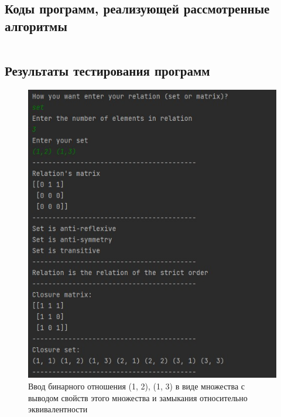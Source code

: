 \documentclass[spec, och, labwork]{shiza}
\begin{document}
        \subsection{Коды программ, реализующей рассмотренные алгоритмы}

            \inputminted[fontsize=\small]{python}{../code/lab2.py}
    
        \subsection{Результаты тестирования программ}

        \begin{figure}[H]
            \centering      %
            \includegraphics[width=1.\textwidth]{1}
            \caption{Ввод бинарного отношения {(1, 2), (1, 3)} в виде множества с выводом свойств этого множества и замыкания относительно эквивалентности}
            \label{fig:image1}
        \end{figure}
        
\end{document}
